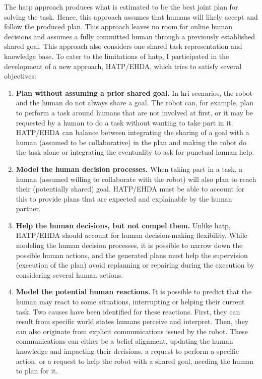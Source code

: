 The \acrshort{hatp} approach produces what is estimated to be the best joint plan for solving the task. Hence, this approach assumes that humans will likely accept and follow the produced plan. This approach leaves no room for online human decisions and assumes a fully committed human through a previously established shared goal. This approach also considers one shared task representation and knowledge base. To cater to the limitations of \acrshort{hatp}, I participated in the development of a new approach, HATP/EHDA, which tries to satisfy several objectives: 
\begin{enumerate}
    \item \textbf{Plan without assuming a prior shared goal.} In \acrshort{hri} scenarios, the robot and the human do not always share a goal. The robot can, for example, plan to perform a task around humans that are not involved at first, or it may be requested by a human to do a task without wanting to take part in it. HATP/EHDA can balance between integrating the sharing of a goal with a human (assumed to be collaborative) in the plan and making the robot do the task alone or integrating the eventuality to ask for punctual human help. 

    \item \textbf{Model the human decision processes.} When taking part in a task, a human (assumed willing to collaborate with the robot) will also plan to reach their (potentially shared) goal. HATP/EHDA must be able to account for this to provide plans that are expected and explainable by the human partner.

    \item \textbf{Help the human decisions, but not compel them.} Unlike \acrshort{hatp}, HATP/EHDA should account for human decision-making flexibility. While modeling the human decision processes, it is possible to narrow down the possible human actions, and the generated plans must help the supervision (execution of the plan) avoid replanning or repairing during the execution by considering several human actions.

    \item \textbf{Model the potential human reactions.} It is possible to predict that the human may react to some situations, interrupting or helping their current task. Two causes have been identified for these reactions. First, they can result from specific world states humans perceive and interpret. Then, they can also originate from explicit communications issued by the robot. These communications can either be a belief alignment, updating the human knowledge and impacting their decisions, a request to perform a specific action, or a request to help the robot with a shared goal, needing the human to plan for it.


\end{enumerate}
